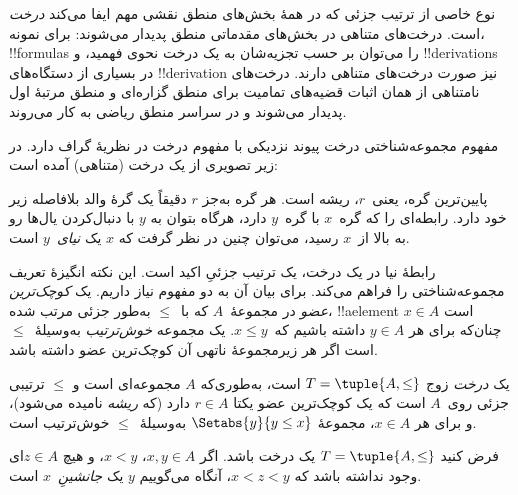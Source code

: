 \documentclass[../../../include/open-logic-section]{subfiles}
\begin{document}

نوع خاصی از ترتیب جزئی که در همهٔ بخش‌های منطق نقشی مهم ایفا می‌کند
\emph{درخت} است. درخت‌های متناهی در بخش‌های مقدماتی منطق پدیدار می‌شوند:
برای نمونه، !!{formula}s را می‌توان بر حسب تجزیه‌شان به یک درخت نحوی
فهمید، و !!{derivation}s در بسیاری از دستگاه‌های !!{derivation} نیز
صورت درخت‌های متناهی دارند.
%
درخت‌های نامتناهی از همان اثبات قضیه‌های تمامیت برای منطق گزاره‌ای و
منطق مرتبهٔ اول پدیدار می‌شوند و در سراسر منطق ریاضی به کار می‌روند.

مفهوم مجموعه‌شناختی درخت پیوند نزدیکی با مفهوم درخت در نظریهٔ گراف
دارد. در زیر تصویری از یک درخت (متناهی) آمده است:

\begin{center}
\end{center}

پایین‌ترین گره، یعنی~$r$، ریشه است. هر گره به‌جز $r$ دقیقاً یک گرهٔ
والد بلافاصله زیر خود دارد. رابطه‌ای را که گره~$x$ با گره~$y$ دارد،
هرگاه بتوان به $y$ با دنبال‌کردن یال‌ها رو به بالا از~$x$ رسید، می‌توان
چنین در نظر گرفت که $x$ یک \emph{نیای}~$y$ است.

رابطهٔ نیا در یک درخت، یک ترتیب جزئیِ اکید است. این نکته انگیزهٔ تعریف
مجموعه‌شناختی را فراهم می‌کند. برای بیان آن به دو مفهوم نیاز داریم.
یک \emph{کوچک‌ترین عضو} در مجموعهٔ~$A$ که با~$\le$ به‌طور جزئی مرتب
شده، !!a{element} $x \in A$ است چنان‌که برای هر $y \in A$ داشته باشیم
که~$x \le y$. یک مجموعه \emph{خوش‌ترتیب} به‌وسیلهٔ~$\le$ است اگر هر
زیرمجموعهٔ ناتهی آن کوچک‌ترین عضو داشته باشد.

\begin{defn}[درخت]
یک \emph{درخت} زوج $T = \tuple{A, \le}$ است، به‌طوری‌که $A$ مجموعه‌ای
است و $\le$ ترتیبی جزئی روی~$A$ است که یک کوچک‌ترین عضو یکتا
$r \in A$ دارد (که \emph{ریشه} نامیده می‌شود)، و برای هر $x \in A$،
مجموعهٔ $\Setabs{y}{y \le x}$ به‌وسیلهٔ~$\le$ خوش‌ترتیب است.
\end{defn}

\begin{defn}[جانشین‌ها]
فرض کنید $T = \tuple{A, \le}$ یک درخت باشد.
اگر $x,y \in A$، $x < y$، و هیچ $z \in A$ای وجود نداشته باشد که
$x < z < y$، آنگاه می‌گوییم $y$ یک \emph{جانشینِ}~$x$ است.
\end{defn}
\end{document}
